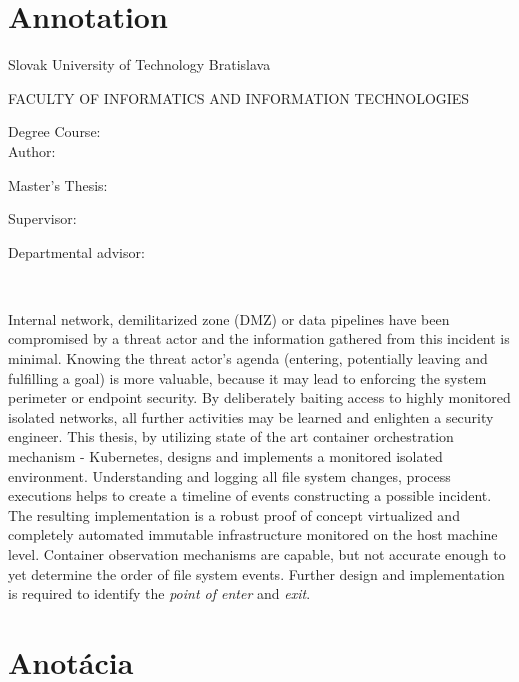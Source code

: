 
\thispagestyle{empty}

\section*{Annotation}

\begin{minipage}[t]{1\columnwidth}%
Slovak University of Technology Bratislava 

FACULTY OF INFORMATICS AND INFORMATION TECHNOLOGIES

Degree Course: \myStudyProgram\\

Author: \myName

Master's Thesis: \myTitle

Supervisor: \mySupervisor

Departmental advisor: \myDepartSupervisor

\myDate\\
\end{minipage}


Internal network, demilitarized zone (DMZ) or data pipelines have been compromised by a threat actor and the information gathered from this incident is minimal. Knowing the threat actor's agenda (entering, potentially leaving and fulfilling a goal) is more valuable, because it may lead to enforcing the system perimeter or endpoint security. By deliberately baiting access to highly monitored isolated networks, all further activities may be learned and enlighten a security engineer. This thesis, by utilizing state of the art container orchestration mechanism - Kubernetes, designs and implements a monitored isolated environment. Understanding and logging all file system changes, process executions helps to create a timeline of events constructing a possible incident. The resulting implementation is a robust proof of concept virtualized and completely automated immutable infrastructure monitored on the host machine level. Container observation mechanisms are capable, but not accurate enough to yet determine the order of file system events. Further design and implementation is required to identify the \textit{point of enter} and \textit{exit}.


\newpage{}\thispagestyle{empty}

\newpage
\thispagestyle{empty}
\mbox{}
\newpage

\thispagestyle{empty}
\section*{Anotácia}


